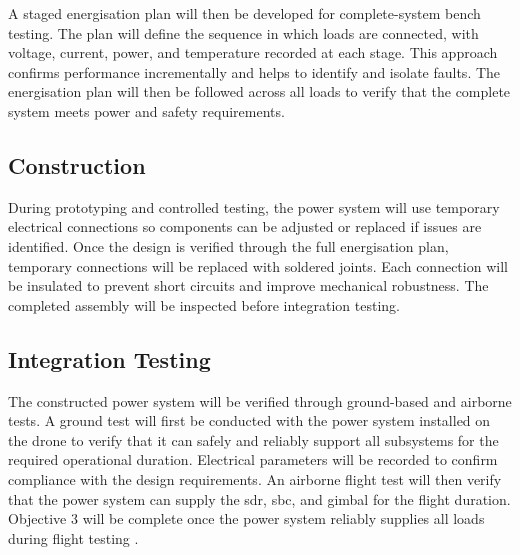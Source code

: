 A staged energisation plan will then be developed for complete-system bench testing. The plan will define the sequence in which loads are connected, with voltage, current, power, and temperature recorded at each stage. This approach confirms performance incrementally and helps to identify and isolate faults. The energisation plan will then be followed across all loads to verify that the complete system meets power and safety requirements.

\subsection{Construction}

During prototyping and controlled testing, the power system will use temporary electrical connections so components can be adjusted or replaced if issues are identified. Once the design is verified through the full energisation plan, temporary connections will be replaced with soldered joints. Each connection will be insulated to prevent short circuits and improve mechanical robustness. The completed assembly will be inspected before integration testing.

\subsection{Integration Testing}

The constructed power system will be verified through ground-based and airborne tests. A ground test will first be conducted with the power system installed on the drone to verify that it can safely and reliably support all subsystems for the required operational duration. Electrical parameters will be recorded to confirm compliance with the design requirements. An airborne flight test will then verify that the power system can supply the \gls{sdr}, \gls{sbc}, and gimbal for the flight duration. Objective 3 will be complete once the power system reliably supplies all loads during flight testing \cite{aguascaARBRESLightWeightCW2013}.
